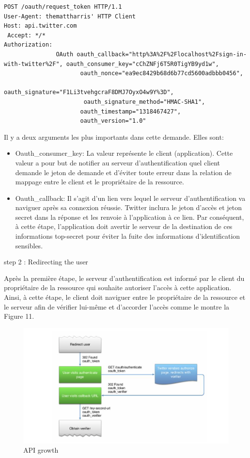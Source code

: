 \begin{verbatim}
POST /oauth/request_token HTTP/1.1
User-Agent: themattharris' HTTP Client
Host: api.twitter.com
 Accept: */*
Authorization:
               OAuth oauth_callback="http%3A%2F%2Flocalhost%2Fsign-in-
with-twitter%2F", oauth_consumer_key="cChZNFj6T5R0TigYB9yd1w",
                      oauth_nonce="ea9ec8429b68d6b77cd5600adbbb0456", 
                       oauth_signature="F1Li3tvehgcraF8DMJ7OyxO4w9Y%3D", 
                       oauth_signature_method="HMAC-SHA1",                            
                      oauth_timestamp="1318467427",
                      oauth_version="1.0"
\end{verbatim}


Il y a deux arguments les plus importants dans cette demande. Elles sont:
\begin{itemize}
\item Oauth\_consumer\_key: La valeur représente le client (application). Cette valeur a pour but de notifier au serveur d'authentification quel client demande le jeton de demande et d'éviter toute erreur dans la relation de mappage entre le client et le propriétaire de la ressource.
\item Oauth\_callback: Il s'agit d'un lien vers lequel le serveur d'authentification va naviguer après sa connexion réussie. Twitter inclura le jeton d'accès et jeton secret dans la réponse et les renvoie à l'application à ce lien. Par conséquent, à cette étape, l'application doit avertir le serveur de la destination de ces informations top-secret pour éviter la fuite des informations d'identification sensibles.
\end{itemize}

step 2 : Redirecting the user

Après la première étape, le serveur d'authentification est informé par le client du propriétaire de la ressource qui souhaite autoriser l'accès à cette application. Ainsi, à cette étape, le client doit naviguer entre le propriétaire de la ressource et le serveur afin de vérifier lui-même et d'accorder l'accès comme le montre la Figure 11.
\begin{figure}[! ht ]
			\centering
			\includegraphics[scale=.4]{./images/twitter_redirecting_user.png}
			\caption {API growth}
		\end{figure}

